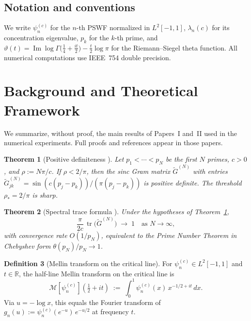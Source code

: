 \documentclass[12pt,a4paper]{amsart}
\newtheorem{theorem}{Theorem}[section]
\theoremstyle{definition}
\newtheorem{definition}[theorem]{Definition}
\newcommand{\R}{\mathbb{R}}
\newcommand{\tr}{\operatorname{tr}}
\begin{document}
\subsection*{Notation and conventions}
We write $\psi_n^{(c)}$ for the $n$-th PSWF normalized in
$L^2[-1,1]$, $\lambda_n(c)$ for its concentration eigenvalue,
$p_k$ for the $k$-th prime, and
$\vartheta(t) = \operatorname{Im}\log\Gamma\!\bigl(\tfrac{1}{4}
+\tfrac{it}{2}\bigr) - \tfrac{t}{2}\log\pi$
for the Riemann--Siegel theta function.
All numerical computations use IEEE~754 double precision.

\section{Background and Theoretical Framework}
\label{sec:background}

We summarize, without proof, the main results of Papers~I and~II
used in the numerical experiments. Full proofs and references
appear in those papers.

\begin{theorem}[Positive definiteness {\cite[Thm.~4.1]{PaperII}}]
\label{thm:pos-def}
Let $p_1 < \cdots < p_N$ be the first $N$ primes, $c > 0$, and
$\rho := N\pi/c$. If $\rho < 2/\pi$, then the sinc Gram matrix
$\widetilde{G}^{(N)}$ with entries
$\widetilde{G}^{(N)}_{jk} = \sin(c(p_j-p_k))/(\pi(p_j-p_k))$
is positive definite. The threshold $\rho_* = 2/\pi$ is sharp.
\end{theorem}

\begin{theorem}[Spectral trace formula {\cite[Thm.~5.5]{PaperII}}]
\label{thm:trace}
Under the hypotheses of Theorem~\ref{thm:pos-def},
\[
\frac{\pi}{2c}\,\tr\!\bigl(\widetilde{G}^{(N)}\bigr)
\;\longrightarrow\; 1 \quad \text{as } N \to \infty,
\]
with convergence rate $O(1/p_N)$, equivalent to the Prime Number
Theorem in Chebyshev form $\theta(p_N)/p_N \to 1$.
\end{theorem}

\begin{definition}[Mellin transform on the critical line]
\label{def:mellin}
For $\psi_n^{(c)} \in L^2[-1,1]$ and $t \in \R$, the half-line
Mellin transform on the critical line is
\[
\mathcal{M}[\psi_n^{(c)}]\!\left(\tfrac{1}{2}+it\right)
\;:=\;
\int_0^1 \psi_n^{(c)}(x)\,x^{-1/2+it}\,dx.
\]
Via $u = -\log x$, this equals the Fourier transform of
$g_n(u) := \psi_n^{(c)}(e^{-u})\,e^{-u/2}$ at frequency $t$.
\end{definition}
\end{document}
